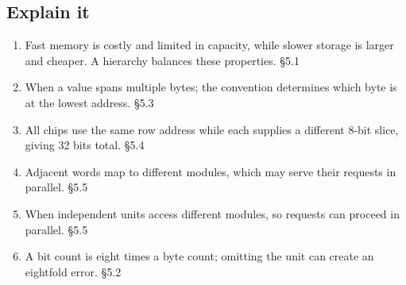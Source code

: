 \documentclass[11pt]{article}
\begin{document}
\begin{keepsection}\subsection{Explain it}

\begin{enumerate}
\item Fast memory is costly and limited in capacity, while slower storage is larger and cheaper. A hierarchy balances these properties. \hfill{\small\color{FAUblue}§5.1}
\item When a value spans multiple bytes; the convention determines which byte is at the lowest address. \hfill{\small\color{FAUblue}§5.3}
\item All chips use the same row address while each supplies a different 8-bit slice, giving 32 bits total. \hfill{\small\color{FAUblue}§5.4}
\item Adjacent words map to different modules, which may serve their requests in parallel. \hfill{\small\color{FAUblue}§5.5}
\item When independent units access different modules, so requests can proceed in parallel. \hfill{\small\color{FAUblue}§5.5}
\item A bit count is eight times a byte count; omitting the unit can create an eightfold error. \hfill{\small\color{FAUblue}§5.2}
\end{enumerate}

\end{keepsection}
\end{document}
